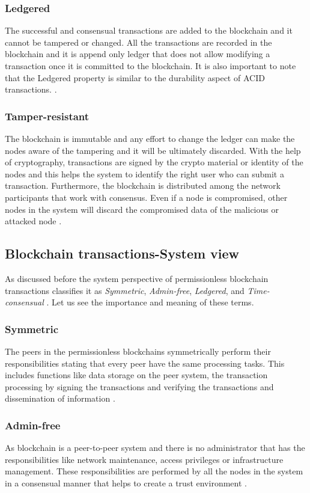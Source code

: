 \documentclass[
  a4paper,  %
  twoside,  %
  bibliography=totoc,
  headsepline,
  cleardoublepage=empty,
  parskip=half,
  draft=false
]{scrbook}
\begin{document}
\subsubsection{Ledgered}
The successful and consensual transactions are added to the blockchain and it cannot be tampered or changed. All the transactions are recorded in the blockchain and it is append only ledger that does not allow modifying a transaction once it is committed to the blockchain. It is also important to note that the Ledgered property is similar to the durability aspect of ACID transactions. \cite{Salt}.

\subsubsection{Tamper-resistant}
The blockchain is immutable and any effort to change the ledger can make the nodes aware of the tampering and it will be ultimately discarded. With the help of cryptography, transactions are signed by the crypto material or identity of the nodes and this helps the system to identify the right user who can submit a transaction. Furthermore, the blockchain is distributed among the network participants that work with consensus. Even if a node is compromised, other nodes in the system will discard the compromised data of the malicious or attacked node \cite{Salt}.

\subsection{Blockchain transactions-System view}
As discussed before the system perspective of permissionless blockchain transactions classifies it as \textit{Symmetric}, \textit{Admin-free}, \textit{Ledgered}, and \textit{Time-consensual} \cite{Salt}. Let us see the importance and meaning of these terms.

\subsubsection{Symmetric}
The peers in the permissionless blockchains symmetrically perform their responsibilities stating that every peer have the same processing tasks. This includes functions like data storage on the peer system, the transaction processing by signing the transactions and verifying the transactions and dissemination of information \cite{Salt}.

\subsubsection{Admin-free}
As blockchain is a peer-to-peer system and there is no administrator that has the responsibilities like network maintenance, access privileges or infrastructure management. These responsibilities are performed by all the nodes in the system in a consensual manner that helps to create a trust environment \cite{Salt}.
\end{document}
